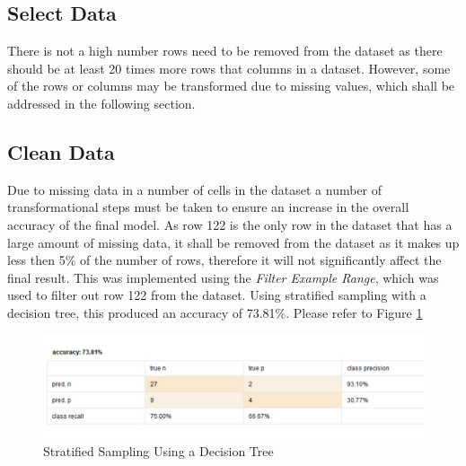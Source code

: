 \subsection*{Select Data}
There is not a high number rows need to be removed from the dataset as there should be at least 20 times more rows that columns in a dataset. However, some of the rows or columns may be transformed due to missing values, which shall be addressed in the following section.
\subsection*{Clean Data}
Due to missing data in a number of cells in the dataset a number of transformational steps must be taken to ensure an increase in the overall accuracy of the final model. As row 122 is the only row in the dataset that has a large amount of missing data, it shall be removed from the dataset as it makes up less then 5\% of the number of rows, therefore it will not significantly affect the final result. This was implemented using the \textit{Filter Example Range}, which was used to filter out row 122 from the dataset. Using stratified sampling with a decision tree, this produced an accuracy of 73.81\%. Please refer to Figure \ref{122}

\begin{figure}[ht]
	\begin{center}
		\advance\leftskip-3cm
		\advance\rightskip-3cm
		\includegraphics[keepaspectratio=true,scale=0.6]{__resources/122Filter.jpg}
		\caption{Stratified Sampling Using a Decision Tree}
		\label{122}
	\end{center}
\end{figure}

